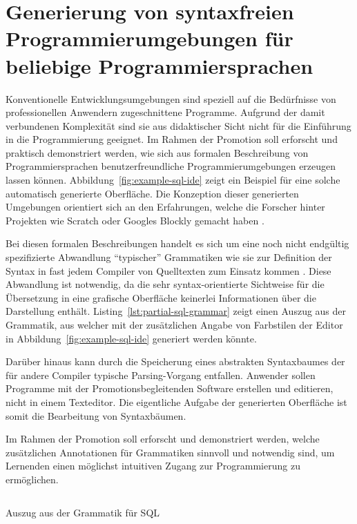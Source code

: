 \documentclass[paper=a4,fontsize=12pt,parskip=half]{scrartcl}
\begin{document}
\section*{Generierung von syntaxfreien Programmierumgebungen für beliebige Programmiersprachen}

Konventionelle Entwicklungsumgebungen sind speziell auf die Bedürfnisse von professionellen Anwendern zugeschnittene Programme. Aufgrund der damit verbundenen Komplexität sind sie aus didaktischer Sicht nicht für die Einführung in die Programmierung geeignet. Im Rahmen der Promotion soll erforscht und praktisch demonstriert werden, wie sich aus formalen Beschreibung von Programmiersprachen benutzerfreundliche Programmierumgebungen erzeugen lassen können. Abbildung~\ref{fig:example-sql-ide} zeigt ein Beispiel für eine solche automatisch generierte Oberfläche. Die Konzeption dieser generierten Umgebungen orientiert sich an den Erfahrungen, welche die Forscher hinter Projekten wie Scratch \cite{resnick_scratch:_2009} oder Googles Blockly gemacht haben \cite{fraser_ten_2015}.

Bei diesen formalen Beschreibungen handelt es sich um eine noch nicht endgültig spezifizierte Abwandlung \enquote{typischer} Grammatiken wie sie zur Definition der Syntax in fast jedem Compiler von Quelltexten zum Einsatz kommen \cite[S. 42ff]{aho_compilers:_2007}. Diese Abwandlung ist notwendig, da die sehr syntax-orientierte Sichtweise für die Übersetzung in eine grafische Oberfläche keinerlei Informationen über die Darstellung enthält. Listing~\ref{lst:partial-sql-grammar} zeigt einen Auszug aus der Grammatik, aus welcher mit der zusätzlichen Angabe von Farbstilen der Editor in Abbildung~\ref{fig:example-sql-ide} generiert werden könnte.

Darüber hinaus kann durch die Speicherung eines abstrakten Syntaxbaumes der für andere Compiler typische Parsing-Vorgang entfallen. Anwender sollen Programme mit der Promotionsbegleitenden Software erstellen und editieren, nicht in einem Texteditor. Die eigentliche Aufgabe der generierten Oberfläche ist somit die Bearbeitung von Syntaxbäumen.

Im Rahmen der Promotion soll erforscht und demonstriert werden, welche zusätzlichen Annotationen für Grammatiken sinnvoll und notwendig sind, um Lernenden einen möglichst intuitiven Zugang zur Programmierung zu ermöglichen.

\begin{listing}[p]
\inputminted{bnf}{sql.grammar}
\caption{Auszug aus der Grammatik für SQL}
\label{lst:partial-sql-grammar}
\end{listing}
\end{document}
